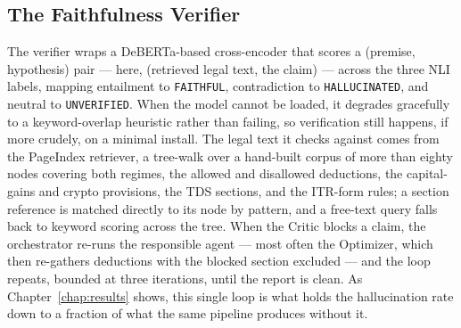 \subsection{The Faithfulness Verifier}
The verifier wraps a DeBERTa-based cross-encoder that scores a (premise,
hypothesis) pair --- here, (retrieved legal text, the claim) --- across the three
NLI labels, mapping entailment to \texttt{FAITHFUL}, contradiction to
\texttt{HALLUCINATED}, and neutral to \texttt{UNVERIFIED}. When the model cannot
be loaded, it degrades gracefully to a keyword-overlap heuristic rather than
failing, so verification still happens, if more crudely, on a minimal install.
The legal text it checks against comes from the PageIndex retriever, a tree-walk
over a hand-built corpus of more than eighty nodes covering both regimes, the
allowed and disallowed deductions, the capital-gains and crypto provisions, the
TDS sections, and the ITR-form rules; a section reference is matched directly to
its node by pattern, and a free-text query falls back to keyword scoring across
the tree. When the Critic blocks a claim, the orchestrator re-runs the
responsible agent --- most often the Optimizer, which then re-gathers deductions
with the blocked section excluded --- and the loop repeats, bounded at three
iterations, until the report is clean. As Chapter~\ref{chap:results} shows, this
single loop is what holds the hallucination rate down to a fraction of what the
same pipeline produces without it.
